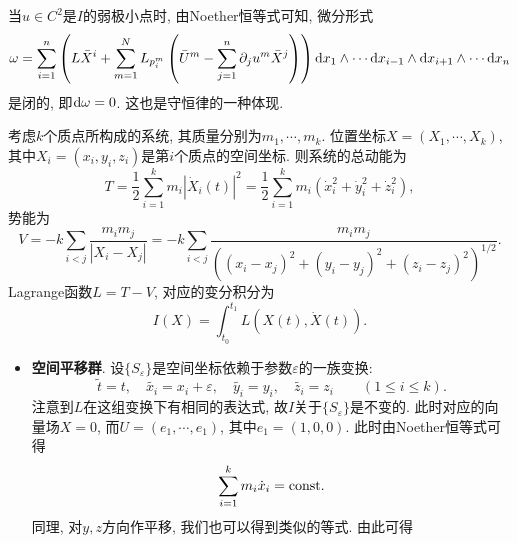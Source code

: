 \begin{remark}
    当$u \in C^2$是$I$的弱极小点时, 由Noether恒等式可知, 微分形式 
    \begin{equation*}
        \omega = \sum_{i = 1}^n\left(L\bar{X}^i + \sum_{m = 1}^NL_{p_i^m}\left(\bar{U}^m - \sum_{j = 1}^n\partial_ju^m\bar{X}^j\right)\right) {\rm d}x_1 \wedge \cdots {\rm d}x_{i - 1} \wedge {\rm d}x_{i + 1} \wedge \cdots {\rm d}x_n
    \end{equation*}
    是闭的, 即${\rm d}\omega = 0$. 这也是守恒律的一种体现.
\end{remark}

\begin{example}
    考虑$k$个质点所构成的系统, 其质量分别为$m_1, \cdots, m_k$.
    位置坐标$X = (X_1, \cdots, X_k)$, 其中$X_i = (x_i, y_i, z_i)$是第$i$个质点的空间坐标.
    则系统的总动能为
    \begin{equation*}
        T = \frac{1}{2}\sum_{i = 1}^km_i|\dot X_i(t)|^2 = \frac{1}{2}\sum_{i = 1}^km_i(\dot x_i^2 + \dot y_i^2 + \dot z_i^2),
    \end{equation*}
    势能为 
    \begin{equation*}
        V = -k\sum_{i < j}\frac{m_im_j}{|X_i - X_j|} = -k\sum_{i < j}\frac{m_im_j}{((x_i - x_j)^2 + (y_i - y_j)^2 + (z_i - z_j)^2)^{1/2}}.
    \end{equation*}
    Lagrange函数$L = T - V$, 对应的变分积分为 
    \begin{equation*}
        I(X) = \int_{t_0}^{t_1}L(X(t), \dot X(t)).
    \end{equation*}
    \begin{itemize}
        \item \textbf{空间平移群}. 设$\{S_{\varepsilon}\}$是空间坐标依赖于参数$\varepsilon$的一族变换:
        \begin{equation*}
            \widetilde{t} = t, \quad \widetilde{x_i} = x_i + \varepsilon, \quad\widetilde{y_i} = y_i, \quad\widetilde{z_i} = z_i \qquad (1 \leq i \leq k).
        \end{equation*}
        注意到$L$在这组变换下有相同的表达式, 故$I$关于$\{S_{\varepsilon}\}$是不变的.
        此时对应的向量场$X = 0$, 而$ U = (e_1, \cdots, e_1)$, 其中$e_1 = (1, 0, 0)$. 
        此时由Noether恒等式可得
        \begin{equation*}
            \sum_{i = 1}^km_i\dot x_i = {\rm const}.
        \end{equation*}
        同理, 对$y, z$方向作平移, 我们也可以得到类似的等式. 由此可得 
        \begin{equation*}

\end{equation*}
\end{itemize}
\end{example}
